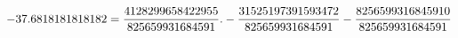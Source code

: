 \documentclass[preview]{standalone}
\begin{document}
\begin{align*}
\special{dvisvgm:raw <g id='unique000'>}-37.6818181818182 = \frac{4128299658422955}{825659931684591}.- \frac{31525197391593472}{825659931684591} - \frac{8256599316845910}{825659931684591}\special{dvisvgm:raw </g>}
\end{align*}
\end{document}
